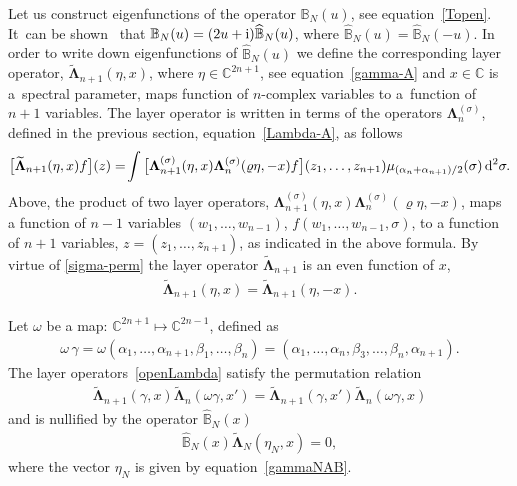 \documentclass[pdftex]{sigma}%
\numberwithin{equation}{section}
\begin{document}
Let us construct eigenfunctions of the operator $\mathbb B_N(u)$, see equation~\eqref{Topen}. It~can be shown~\cite{Derkachov:2003qb} that $
\mathbb B_N(u)=(2u+{\rm i}) \widehat{\mathbb B}_N(u)$, where $\widehat{\mathbb B}_N(u)=\widehat{\mathbb B}_N(-u)$. In order to write down
eigenfunctions of $\widehat{\mathbb B}_N(u)$ we define the corresponding layer operator, $\widetilde{ \boldsymbol \Lambda}_{n+1}(\eta,x)$,
where $\eta\in \mathbb C^{2n+1}$, see equation~\eqref{gamma-A} and $x\in\mathbb C$ is a~spectral parameter, maps function of $n$-complex variables to a~function of $n+1$ variables.
The layer operator is written in terms of the operators $\boldsymbol \Lambda_n^{(\sigma)}$, defined in the previous section, equation~\eqref{Lambda-A}, as follows
\begin{gather}\label{openLambda}
\big[\widetilde{ \boldsymbol \Lambda}_{n+1}(\eta,x) f\big](z)
=\!
\int \big[\boldsymbol \Lambda^{(\sigma)}_{n+1}(\eta,x)\boldsymbol \Lambda^{(\sigma)}_{n}(\varrho\eta,-x) f\big](z_1,\dots, z_{n+1})
\mu_{{(\alpha_{n}+\alpha_{n+1})}/2}(\sigma)\, {\rm d}^2\sigma .
\end{gather}
Above, the product of two layer operators, $\boldsymbol \Lambda^{(\sigma)}_{n+1}(\eta,x)\boldsymbol \Lambda^{(\sigma)}_{n}(\varrho\eta,-x)
$, maps a function of $n-1$ variables $(w_1,\dots, w_{n-1})$, $f(w_1,\dots, w_{n-1},\sigma)$, to a function of $n+1$ variables, $ z=(z_1,\dots,z_{n+1})$, as indicated in
the above formula. By virtue of \eqref{sigma-perm}
 the layer operator $\widetilde{\boldsymbol \Lambda}_{n+1}$ is an even function of $x$,
\begin{gather*}
\widetilde{ \boldsymbol \Lambda}_{n+1}(\eta,x)= \widetilde{ \boldsymbol \Lambda}_{n+1}(\eta,-x).
\end{gather*}

Let $\omega$ be a map: $\mathbb C^{2n+1}\mapsto \mathbb C^{2n-1}$, defined as
\begin{gather*}
\omega\,\gamma=\omega(\alpha_1,\dots,\alpha_{n+1},\beta_{1},\dots,\beta_n)
=(\alpha_1,\dots,\alpha_n,\beta_{3},\dots,\beta_{n},\alpha_{n+1}).
\end{gather*}
The layer operators~\eqref{openLambda} satisfy the permutation relation~\cite{Derkachov:2003qb}
\begin{gather*}
\widetilde{ \boldsymbol \Lambda}_{n+1}(\gamma,x)\widetilde{ \boldsymbol \Lambda}_{n}(\omega\gamma,x')=
\widetilde{ \boldsymbol \Lambda}_{n+1}(\gamma,x')\widetilde{ \boldsymbol \Lambda}_{n}(\omega\gamma,x)
\end{gather*}
and is nullified by the operator $\widehat{\mathbb B}_N(x)$
\begin{gather}\label{BopenL=0}
\widehat{\mathbb B}_N(x)\widetilde{ \boldsymbol \Lambda}_{N}(\eta_N,x)=0,
\end{gather}
where the vector $\eta_N$ is given by equation~\eqref{gammaNAB}.
\end{document}
